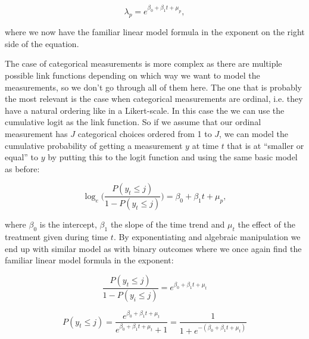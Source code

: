 \documentclass[12pt,a4paper,leqno]{report}
\theoremstyle{plain}
\theoremstyle{definition}
\theoremstyle{remark}
\begin{document}
\begin{def}\label{oneerror}
    \begin{equation}
        \lambda_p=e^{\beta_0 + \beta_1 t + \mu_p},
    \end{equation}
\end{def}where we now have the familiar linear model formula in the exponent on
the right side of the equation.

The case of categorical measurements is more complex as there are multiple
possible link functions depending on which way we want to model the
measurements, so we don't go through all of them here. The one that is probably
the most relevant is the case when categorical measurements are ordinal, i.e.
they have a natural ordering like in a Likert-scale. In this case the we can
use the cumulative logit as the link function. So if we assume that our ordinal
measurement has \(J\) categorical choices ordered from 1 to \(J\), we can model
the cumulative probability of getting a measurement \(y\) at time \(t\) that is at
``smaller or equal'' to \(y\) by putting this to the logit function and using the same
basic model as before:

\begin{def}\label{oneerror}
    \begin{equation}
        \log_e\bigg({\frac{P(y_t \leq j)}{1 - P(y_t \leq j)}}\bigg)=\beta_0 + \beta_1 t + \mu_p,
    \end{equation}
\end{def}where \(\beta_0\) is the intercept, \(\beta_1\) the slope of the time
trend and \(\mu_t\) the effect of the treatment given during time \(t\). By
exponentiating and algebraic manipulation we end up with similar model as with
binary outcomes where we once again find the familiar linear model formula in
the exponent:

\begin{def}\label{}
    \begin{equation}\label{ord_exponentiating}
        \frac{P(y_t \leq j)}{1 - P(y_i \leq j)}=e^{\beta_0 + \beta_1 t + \mu_t}
    \end{equation}
\end{def}

\begin{def}\label{}
    \begin{equation}\label{ord_algmanipulation}
        P(y_t \leq j)=\frac{e^{\beta_0 + \beta_1 t + \mu_t}}{e^{\beta_0 + \beta_1 t + \mu_t}+1}=\frac{1}{1+e^{-(\beta_0 + \beta_1 t + \mu_t)}}
    \end{equation}
\end{def}
\end{document}
